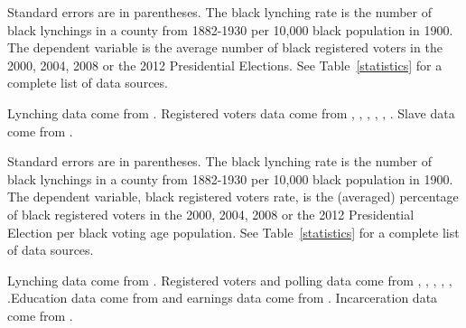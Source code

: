 \documentclass[AEJ, finalmode]{AEA}
\begin{document}
\begin{table}
		\caption{The Association between Lynching Rates and Black Registered Voters}
			
			\begin{tablenotes}   
			Standard errors are in parentheses. The black lynching rate is the number of black lynchings in a county from 1882-1930 per 10,000 black population in 1900. The dependent variable is the average number of black registered voters in the 2000, 2004, 2008 or the 2012 Presidential Elections. See Table~\ref{statistics} for a complete list of data sources.                                                 
			\end{tablenotes}
			\begin{tablenotes}[Source]
			Lynching data come from . Registered voters data come from , , , , , . Slave data come from .
			\end{tablenotes}
		\label{regblack}%
\end{table}





\begin{table}
		\caption{The Association between Lynching Rates and Voter Registration Rates among Blacks}
				
				\begin{tablenotes}   
				Standard errors are in parentheses. The black lynching rate is the number of black lynchings in a county from 1882-1930 per 10,000 black population in 1900. The dependent variable, black registered voters rate, is the (averaged) percentage of black registered voters in the 2000, 2004, 2008 or the 2012 Presidential Election per black voting age population. See Table~\ref{statistics} for a complete list of data sources.                                                  
				\end{tablenotes}
				\begin{tablenotes}[Source]
				Lynching data come from . Registered voters and polling data come from , , , , , .Education data come from  and earnings data come from . Incarceration data come from .
				\end{tablenotes}
		\label{lynchmob}%
\end{table}
\end{document}

